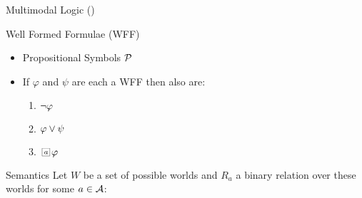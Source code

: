 \documentclass[10pt]{beamer}
\begin{document}
\begin{frame}{Multimodal Logic ()}
    \begin{block}{Well Formed Formulae (WFF)}
            \begin{itemize}
                \item Propositional Symbols $\cal{P}$
                \item If $\varphi$ and $\psi$ are each a WFF then also are:
                    \begin{enumerate}%
                        \item $\neg \varphi$
                        \item $\varphi \lor \psi$
                        \item $\nec{a} \formula$
                    \end{enumerate}
            \end{itemize}
        \end{block}
\end{frame}

\begin{frame}{Semantics}
    Let $W$ be a set of possible worlds and $R_a$ a binary relation over these
    worlds for some $a \in {\mathcal{A}}$:

  \begin{itemize}
  \end{itemize}
\end{frame}
\end{document}

